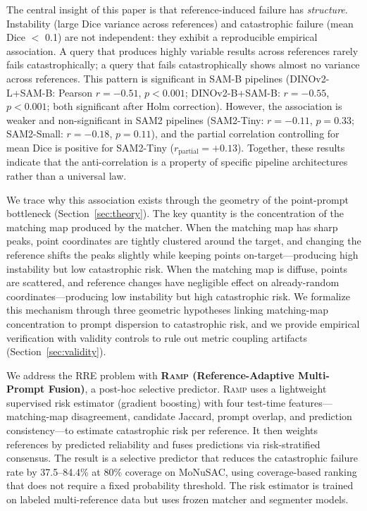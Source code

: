 \documentclass[11pt]{article}
\newcommand{\RAMP}{\textsc{Ramp}}
\begin{document}
The central insight of this paper is that reference-induced failure has
\emph{structure}. Instability (large Dice variance across references) and
catastrophic failure (mean Dice $<$ 0.1) are not independent: they exhibit a
reproducible empirical association. A query that produces highly variable
results across references rarely fails catastrophically; a query that fails
catastrophically shows almost no variance across references. This pattern is
significant in SAM-B pipelines (DINOv2-L+SAM-B: Pearson $r=-0.51$, $p<0.001$;
DINOv2-B+SAM-B: $r=-0.55$, $p<0.001$; both significant after Holm
correction). However, the association is weaker and non-significant in SAM2
pipelines (SAM2-Tiny: $r=-0.11$, $p=0.33$; SAM2-Small: $r=-0.18$, $p=0.11$),
and the partial correlation controlling for mean Dice is positive for
SAM2-Tiny ($r_{\text{partial}}=+0.13$). Together, these results indicate
that the anti-correlation is a property of specific pipeline architectures
rather than a universal law.

We trace why this association exists through the geometry of the point-prompt
bottleneck (Section~\ref{sec:theory}). The key quantity is the concentration
of the matching map produced by the matcher. When the matching map has sharp
peaks, point coordinates are tightly clustered around the target, and
changing the reference shifts the peaks slightly while keeping points
on-target---producing high instability but low catastrophic risk. When the
matching map is diffuse, points are scattered, and reference changes have
negligible effect on already-random coordinates---producing low instability
but high catastrophic risk. We formalize this mechanism through three
geometric hypotheses linking matching-map concentration to prompt dispersion
to catastrophic risk, and we provide empirical verification with validity
controls to rule out metric coupling artifacts
(Section~\ref{sec:validity}).

We address the RRE problem with \textbf{\RAMP{} (Reference-Adaptive
Multi-Prompt Fusion)}, a post-hoc selective predictor. \RAMP{} uses a
lightweight supervised risk estimator (gradient boosting) with four
test-time features---matching-map disagreement, candidate Jaccard, prompt
overlap, and prediction consistency---to estimate catastrophic risk per
reference. It then weights references by predicted reliability and fuses
predictions via risk-stratified consensus. The result is a selective
predictor that reduces the catastrophic failure rate by 37.5--84.4\% at 80\%
coverage on MoNuSAC, using coverage-based ranking that does not require a
fixed probability threshold. The risk estimator is trained on labeled
multi-reference data but uses frozen matcher and segmenter models.
\end{document}
